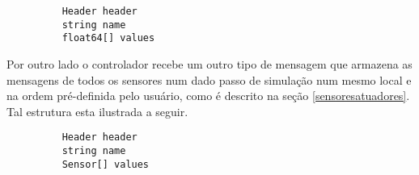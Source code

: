 \begin{figure}[H]
	\begin{verbatim}
	Header header
	string name
	float64[] values
	\end{verbatim}	
\end{figure}

Por outro lado o controlador recebe um outro tipo de mensagem que armazena as mensagens de todos os sensores num dado passo de simulação num mesmo local e na ordem pré-definida pelo usuário, como é descrito na seção \ref{sensoresatuadores}. Tal estrutura esta ilustrada a seguir.

\begin{figure}[H]
	\begin{verbatim}
	Header header
	string name
	Sensor[] values
	\end{verbatim}
\end{figure}